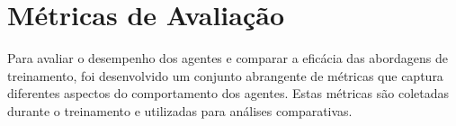 

\section{Métricas de Avaliação}
\label{sec:metricas_avaliacao}

Para avaliar o desempenho dos agentes e comparar a eficácia das abordagens de treinamento, foi desenvolvido um conjunto abrangente de métricas que captura diferentes aspectos do comportamento dos agentes. Estas métricas são coletadas durante o treinamento e utilizadas para análises comparativas.


